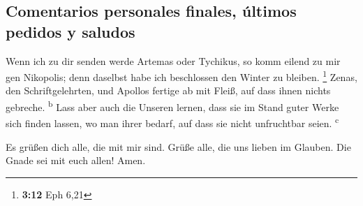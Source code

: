 \hypertarget{comentarios-personales-finales-uxfaltimos-pedidos-y-saludos}{%
\subsection{Comentarios personales finales, últimos pedidos y
saludos}\label{comentarios-personales-finales-uxfaltimos-pedidos-y-saludos}}

 Wenn ich zu dir senden werde Artemas oder Tychikus, so
komm eilend zu mir gen Nikopolis; denn daselbst habe ich beschlossen den
Winter zu bleiben. \footnote{\textbf{3:12} Eph 6,21} 
Zenas, den Schriftgelehrten, und Apollos fertige ab mit Fleiß, auf dass
ihnen nichts gebreche. \textsuperscript{b}  Lass aber
auch die Unseren lernen, dass sie im Stand guter Werke sich finden
lassen, wo man ihrer bedarf, auf dass sie nicht unfruchtbar seien.
\textsuperscript{c}

 Es grüßen dich alle, die mit mir sind. Grüße alle, die
uns lieben im Glauben. Die Gnade sei mit euch allen! Amen.
